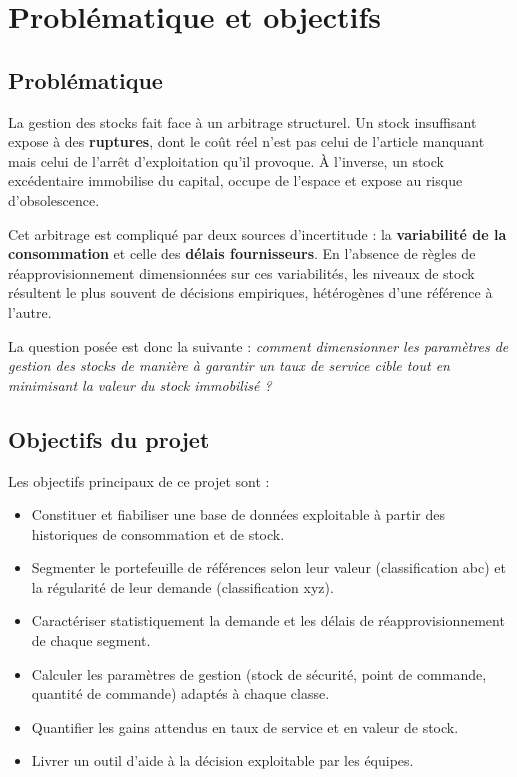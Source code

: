 \section{Problématique et objectifs}
\label{sec:problematique}

\subsection{Problématique}

\hspace{1cm}La gestion des stocks fait face à un arbitrage structurel. Un stock
insuffisant expose à des \textbf{ruptures}, dont le coût réel n'est pas celui de
l'article manquant mais celui de l'arrêt d'exploitation qu'il provoque. À
l'inverse, un stock excédentaire immobilise du capital, occupe de l'espace et
expose au risque d'obsolescence.

Cet arbitrage est compliqué par deux sources d'incertitude : la
\textbf{variabilité de la consommation} et celle des \textbf{délais
fournisseurs}. En l'absence de règles de réapprovisionnement dimensionnées sur
ces variabilités, les niveaux de stock résultent le plus souvent de décisions
empiriques, hétérogènes d'une référence à l'autre.

La question posée est donc la suivante : \emph{comment dimensionner les
paramètres de gestion des stocks de manière à garantir un taux de service cible
tout en minimisant la valeur du stock immobilisé ?}


\subsection{Objectifs du projet}

Les objectifs principaux de ce projet sont :

\begin{itemize}
  \item Constituer et fiabiliser une base de données exploitable à partir des
    historiques de consommation et de stock.
  \item Segmenter le portefeuille de références selon leur valeur
    (classification \gls{abc}) et la régularité de leur demande
    (classification \gls{xyz}).
  \item Caractériser statistiquement la demande et les délais de
    réapprovisionnement de chaque segment.
  \item Calculer les paramètres de gestion (stock de sécurité, point de
    commande, quantité de commande) adaptés à chaque classe.
  \item Quantifier les gains attendus en taux de service et en valeur de stock.
  \item Livrer un outil d'aide à la décision exploitable par les équipes.
\end{itemize}

